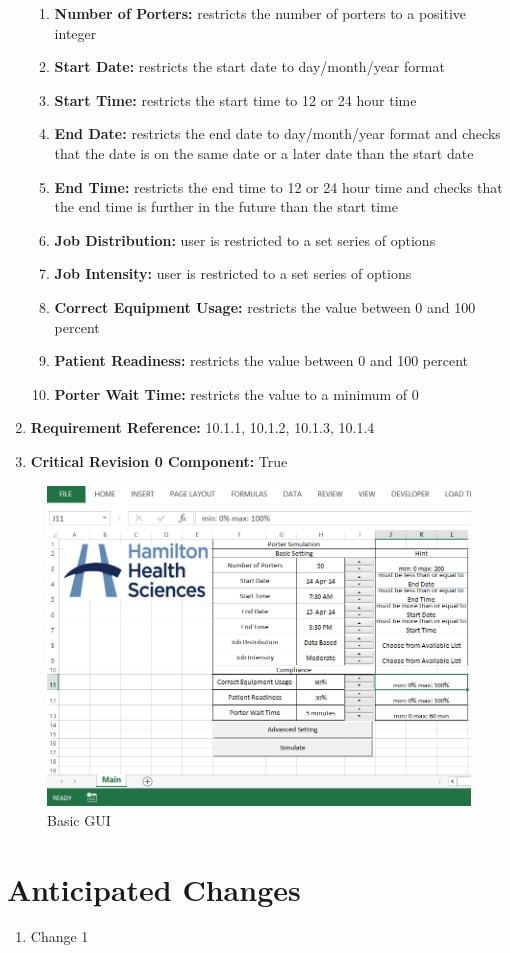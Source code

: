 \documentclass[paper=letter, fontsize=10pt]{scrartcl}
\numberwithin{equation}{section}		%
\numberwithin{figure}{section}			%
\numberwithin{table}{section}				%
\begin{document}
\begin{enumerate}[]
	\begin{enumerate}[]
		\item \textbf{Number of Porters:} restricts the number of porters to a positive integer 
		\item \textbf{Start Date:} restricts the start date to day/month/year format
		\item \textbf{Start Time:} restricts the start time to 12 or 24 hour time
		\item \textbf{End Date:} restricts the end date to day/month/year format and checks that the date is on the same date or a later date than the start date
		\item \textbf{End Time:} restricts the end time to 12 or 24 hour time and checks that the end time is further in the future than the start time
		\item \textbf{Job Distribution:} user is restricted to a set series of options
		\item \textbf{Job Intensity:} user is restricted to a set series of options
		\item \textbf{Correct Equipment Usage:} restricts the value between 0 and 100 percent 
		\item \textbf{Patient Readiness:} restricts the value between 0 and 100 percent
		\item \textbf{Porter Wait Time:} restricts the value to a minimum of 0		
	\end{enumerate}
	\item \textbf{Requirement Reference:} 10.1.1, 10.1.2, 10.1.3, 10.1.4
	\item \textbf{Critical Revision 0 Component:} True
\end{enumerate}

\newpage
\begin{figure}[H]
	\begin{center}
		\includegraphics[width=1\columnwidth]{../GUI_Mockups/BasicGUI.png}
		\caption{Basic GUI}
	\end{center}
\end{figure}
\newpage

\section{Anticipated Changes}
\begin{enumerate}[1]
	\item Change 1
\end{enumerate}

\end{document}

